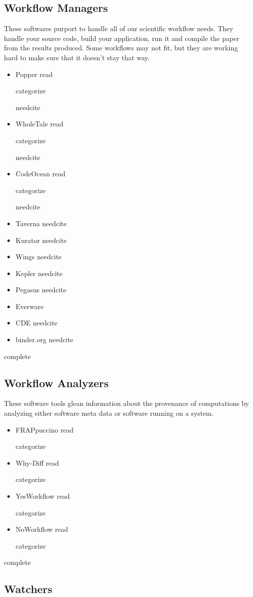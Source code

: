 \documentclass{article}
\newcommand{\Read}{
	\gls{read}
}
\newcommand{\categorize}{
	\gls{categorize}
}
\newcommand{\complete}{
	\gls{complete}
}
\newcommand{\needcite}{
	\gls{needcite}
}
\begin{document}
\subsection{Workflow Managers}

These softwares purport to handle all of our scientific workflow needs. They handle your source code, build your application, run it and compile the paper from the results produced. Some workflows may not fit, but they are working hard to make sure that it doesn't stay that way.

\begin{itemize}
\item Popper \Read \categorize \needcite
\item WholeTale \Read \categorize \needcite
\item CodeOcean \Read \categorize \needcite
\item Taverna \needcite
\item Kurator \needcite
\item Wings \needcite
\item Kepler \needcite
\item Pegasus \needcite
\item Everware \cite{everware}
\item CDE \needcite
\item binder.org \needcite
\end{itemize}

\complete

\subsection{Workflow Analyzers}

These software tools glean information about the provenance of computations by analyzing either software meta data or software running on a system.

\begin{itemize}
\item FRAPpuccino \cite{FRAPpuccino} \Read \categorize
\item Why-Diff \cite{computational-meta-data} \Read \categorize
\item YesWorkflow \cite{computational-meta-data} \Read \categorize
\item NoWorkflow \cite{computational-meta-data} \Read \categorize
\end{itemize}

\complete

\subsection{Watchers}
\end{document}
